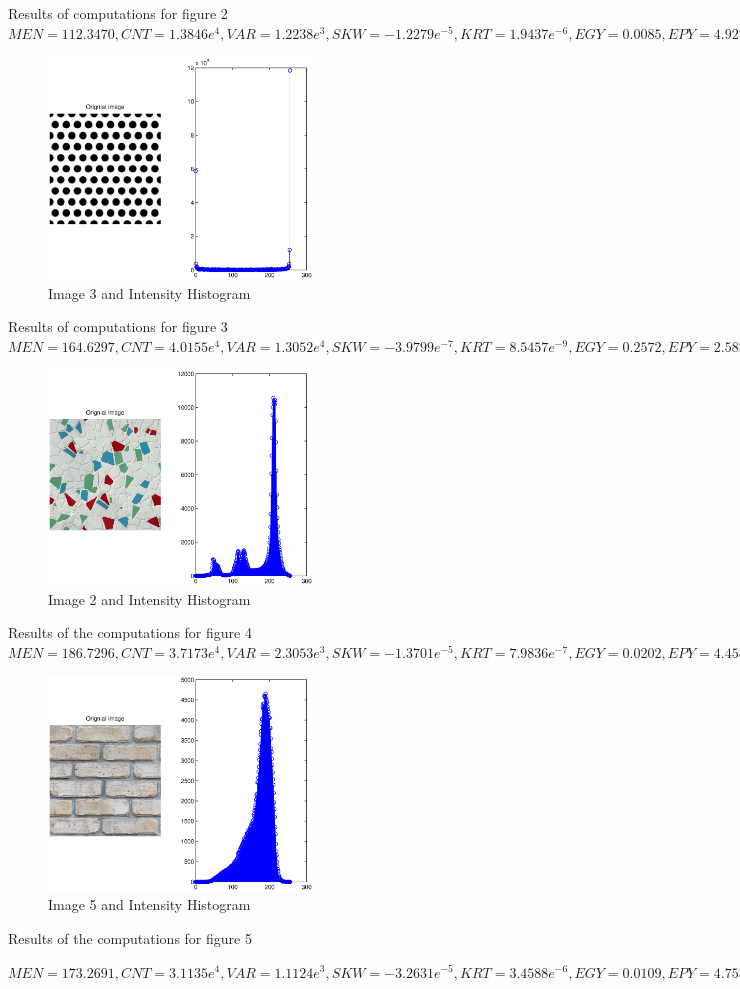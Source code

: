 \documentclass[10pt]{article}
\begin{document}
Results of computations for figure 2
$MEN =112.3470, CNT =1.3846e^4, VAR =1.2238e^3, SKW =-1.2279e^{-5}, KRT =1.9437e^{-6}, EGY =0.0085, EPY =4.9270$\\

\clearpage

\begin{figure}[h!]
\centering
\includegraphics[width=70mm]{Image3.eps}
\caption{Image 3 and Intensity Histogram}
\end{figure} 

Results of computations for figure 3
$MEN =164.6297, CNT =4.0155e^4, VAR =1.3052e^4, SKW =-3.9799e^{-7}, KRT =8.5457e^{-9}, EGY =0.2572,  EPY =2.5825$\\


\begin{figure}[h!]
\centering
\includegraphics[width=70mm]{image4.eps}
\caption{Image 2 and Intensity Histogram}
\end{figure} 


Results of the computations for figure 4
$MEN =186.7296, CNT =3.7173e^4, VAR =2.3053e^3, SKW =-1.3701e^{-5}, KRT =7.9836e^{-7}, EGY =0.0202, EPY =4.4584$\\
\clearpage

\begin{figure}[h!]
\centering
\includegraphics[width=70mm]{image5.eps}
\caption{Image 5 and Intensity Histogram}
\end{figure} 
Results of the computations for figure 5

$MEN =173.2691, CNT =3.1135e^4, VAR =1.1124e^3, SKW =-3.2631e^{-5}, KRT =3.4588e^{-6}, EGY =0.0109, EPY =4.7532$
\end{document}
